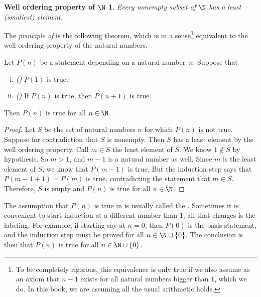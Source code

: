 \theoremstyle{plain}
\newtheorem*{wellordprop}{Well ordering property of $\N$}
\hypertarget{wop:link}{}%
\begin{wellordprop}
Every nonempty subset of $\N$ has a least (smallest) element.
\end{wellordprop}

The \emph{principle of } is
the following theorem, which is in a sense\footnote{To be completely
rigorous, this equivalence is only true if we
also assume as an axiom that $n-1$ exists for all natural numbers bigger than $1$, which we
do.  In this book, we are assuming all the usual arithmetic holds.}
equivalent to the well ordering property of the natural numbers.

\begin{thm} \label{induction:thm}
Let $P(n)$ be a statement depending on a natural number~$n$.  Suppose that
\begin{enumerate}[(i)]
\item \emph{()} $P(1)$ is true.
\item \emph{()} If $P(n)$ is true, then $P(n+1)$ is true.
\end{enumerate}
Then $P(n)$ is true for all $n \in \N$.
\end{thm}

\begin{proof}
Let $S$ be the set of natural numbers $n$ for which $P(n)$ is
not true.  Suppose for contradiction that
$S$ is nonempty.  Then $S$ has a least element by the well ordering
property.  Call $m \in S$ the least element of $S$.  We know $1 \notin
S$ by hypothesis.  So $m > 1$, and $m-1$ is a natural number as well.
Since $m$ is the least element of $S$, we know that $P(m-1)$ is true.
But the induction step says that $P(m-1+1) = P(m)$ is true, 
contradicting the statement that $m \in S$.  Therefore, $S$ is empty and 
$P(n)$ is true for all $n \in \N$.
\end{proof}

The assumption that
$P(n)$ is true in 
is usually called the \emph{}.
Sometimes it is convenient to start induction
at a different number than 1,
all that changes is the labeling.
For example,
if starting say at $n=0$, then $P(0)$ is the basis statement,
and the induction step must be proved for all
$n \in \N \cup \{ 0 \}$.
The conclusion is then that $P(n)$ is true for all
$n \in \N \cup \{ 0 \}$.

